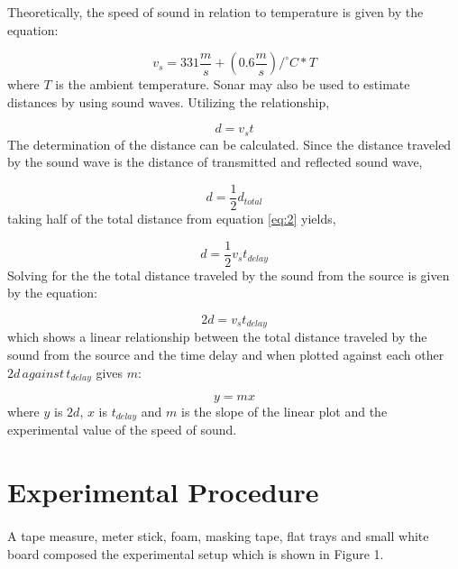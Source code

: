 \documentclass{article}
\begin{document}
\begin{multicols}{2}
Theoretically, the speed of sound in relation to temperature is given by the equation:

\begin{equation}\label{eq:1}
v_{s}=331 \frac{m}{s}+(0.6 \frac{m}{s})/^{\circ}C * T
\end{equation} where $T$ is the ambient temperature. Sonar may also be used to estimate distances by using sound waves. Utilizing the relationship, 

\begin{equation}\label{eq:2}
d = v_{s}t
\end{equation} \indent The determination of the distance can be calculated. Since the distance traveled by the sound wave is the distance of transmitted and reflected sound wave, 

\begin{equation}\label{eq:3}
d = \frac{1}{2}d_{total}
\end{equation} taking half of the total distance from equation \eqref{eq:2} yields,

\begin{equation}\label{eq:4}
d = \frac{1}{2}v_{s}t_{delay}
\end{equation} \indent Solving for the the total distance traveled by the sound from the source is given by the equation:

\begin{equation}\label{eq:5}
2d = v_{s}t_{delay}
\end{equation} which shows a linear relationship between the total distance traveled by the sound from the source and the time delay and when plotted against each other $2d \, against \, t_{delay}$ gives $m$:

\begin{equation}\label{eq:6}
y = mx
\end{equation} where $y$ is $2d$, $x$ is $t_{delay}$ and $m$ is the slope of the linear plot and the experimental value of the speed of sound. 


\section{Experimental Procedure}
\paragraph{}
A tape measure, meter stick, foam, masking tape, flat trays and small white board composed the experimental setup which is shown in Figure 1. 


\end{multicols}
\end{document}
